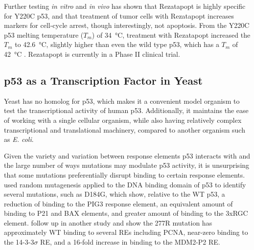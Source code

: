 Further testing \textit{in vitro} and \textit{in vivo} has shown that Rezatapopt is highly specific for Y220C p53, and that treatment of tumor cells with Rezatapopt increases markers for cell-cycle arrest, though interestingly, not apoptosis. From the Y220C p53 melting temperature (\(T_{m}\)) of \qty{34}{\degreeCelsius}, treatment with Rezatapopt increased the \(T_{m}\) to \qty{42.6}{\degreeCelsius}, slightly higher than even the wild type p53, which has a \(T_{m}\) of \qty{42}{\degreeCelsius} \parencite{puzio-kuterRestorationTumorSuppressor2025}. Rezatapopt is currently in a Phase II clinical trial.

\subsection{p53 as a Transcription Factor in Yeast}

Yeast has no homolog for p53, which makes it a convenient model organism to test the transcriptional activity of human p53. Additionally, it maintains the ease of working with a single cellular organism, while also having relatively complex transcriptional and translational machinery, compared to another organism such as \textit{E. coli}.

Given the variety and variation between response elements p53 interacts with and the large number of ways mutations may modulate p53 activity, it is unsurprising that some mutations preferentially disrupt binding to certain response elements. \textcite{ingaP53MutantsExhibiting2001b} used random mutagenesis applied to the DNA binding domain of p53 to identify several mutations, such as D184G, which show, relative to the WT p53, a reduction of binding to the PIG3 response element, an equivalent amount of binding to P21 and BAX elements, and greater amount of binding to the 3xRGC element. \textcite{resnickFunctionalMutantsSequencespecific2003} follow up in another study and show the 277R mutation has approximately WT binding to several REs including PCNA, near-zero binding to the 14-3-3\(\sigma\) RE, and a 16-fold increase in binding to the MDM2-P2 RE.